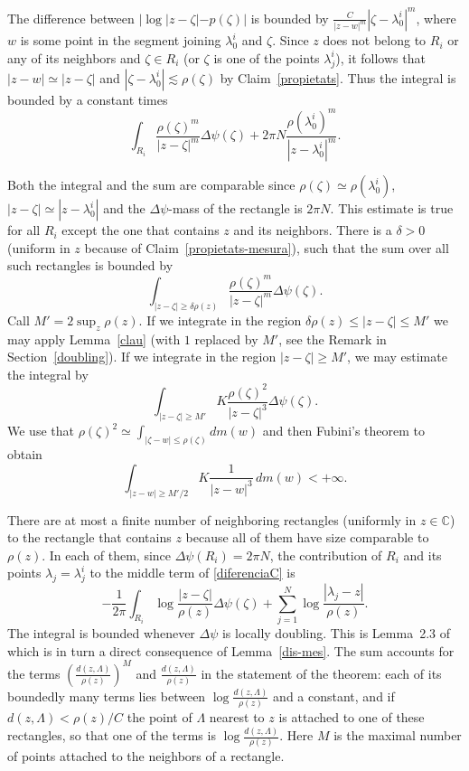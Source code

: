 \documentclass[12pt,twoside,final,psamsfonts]{amsart}
\theoremstyle{plain}
\theoremstyle{remark}
\theoremstyle{definition}
\newcommand{\C}{{\mathbb C}}
\begin{document}
The difference between $|\log|z-\zeta|-p(\zeta)|$ is bounded by $\frac
C{|z-w|^{m}}|\zeta-\lambda_0^i|^m$, where $w$ is some point in the segment
joining $\lambda_0^i$ and $\zeta$. Since $z$
does not belong to $R_i$ or any of its neighbors and $\zeta\in R_i$ (or
$\zeta$ is one of the points $\lambda^i_j$),
it follows that $|z-w|\simeq |z-\zeta|$ and  $|\zeta-\lambda_0^i|\lesssim
\rho(\zeta)$ by Claim~\ref{propietats}. Thus the integral is bounded by a constant times
\[
\int_{R_i}\frac{\rho(\zeta)^{m}}{|z-\zeta|^{m}}\Delta\psi(\zeta)+
2\pi N\frac{\rho(\lambda_0^i)^{m}}{|z-\lambda_0^i|^{m}}.
\]

Both the integral and the sum are comparable since $\rho(\zeta)\simeq
\rho(\lambda_0^i)$, $|z-\zeta|\simeq |z-\lambda_0^i|$ and the
$\Delta\psi$-mass of the rectangle is $2\pi N$.
This estimate is true for all $R_i$ except the one that contains $z$
and its neighbors. There is a $\delta>0$ (uniform in $z$ because of
Claim~\ref{propietats-mesura}), such that the sum over 
all such rectangles is bounded by
\[
\int_{|z-\zeta|\ge \delta\rho(z)} 
\frac{\rho(\zeta)^m}{|z-\zeta|^{m}}\Delta\psi(\zeta).
\] 
Call $M'=2\sup_z \rho(z)$.
If we integrate in the region $\delta\rho(z)\le|z-\zeta|\le M'$ we may apply
Lemma~\ref{clau} (with $1$ replaced by $M'$, see the Remark in
Section~\ref{doubling}). If we integrate in the region $|z-\zeta|\ge M'$, we may
estimate the integral by
\[
\int_{|z-\zeta|\ge M'}
K\frac{\rho(\zeta)^2}{|z-\zeta|^{3}}\Delta\psi(\zeta).
\]
We use that $\rho(\zeta)^2\simeq \int_{|\zeta-w|\le\rho(\zeta)}dm(w)$
and then
Fubini's theorem to obtain
\[
\int_{|z-w|\ge M'/2}
K\frac{1}{|z-w|^{3}}\, dm(w)<+\infty.
\]

There are at most a finite number of neighboring rectangles (uniformly
in $z\in \C$) to the rectangle that contains $z$ because all of them have size
comparable to $\rho(z)$. In each of them, since $\Delta\psi(R_i)=2\pi N$,
the contribution of $R_i$ and its points $\lambda_j=\lambda^i_j$ to the
middle term of \eqref{diferenciaC} is
\[
-\frac 1{2\pi}\int_{R_i} \log \frac{|z-\zeta|}{\rho(z)}\Delta\psi(\zeta) +
\sum_{j=1}^N\log\frac{|\lambda_j-z|}{\rho(z)}.
\]
The integral is bounded whenever $\Delta\psi$ is locally doubling. This is
Lemma~2.3 of \cite{Christ91} which is in turn a  direct consequence of
Lemma~\ref{dis-mes}. The sum accounts for the terms
$\left(\frac{d(z,\Lambda)}{\rho(z)}\right)^M$ and $\frac{d(z,\Lambda)}{\rho(z)}$
in the statement of the theorem: each of its boundedly many terms lies between
$\log\frac{d(z,\Lambda)}{\rho(z)}$ and a constant, and if
$d(z,\Lambda)<\rho(z)/C$ the point of $\Lambda$ nearest to $z$ is attached to
one of these rectangles, so that one of the terms is
$\log\frac{d(z,\Lambda)}{\rho(z)}$. Here $M$ is the maximal number of points
attached to the neighbors of a rectangle.
\end{document}
